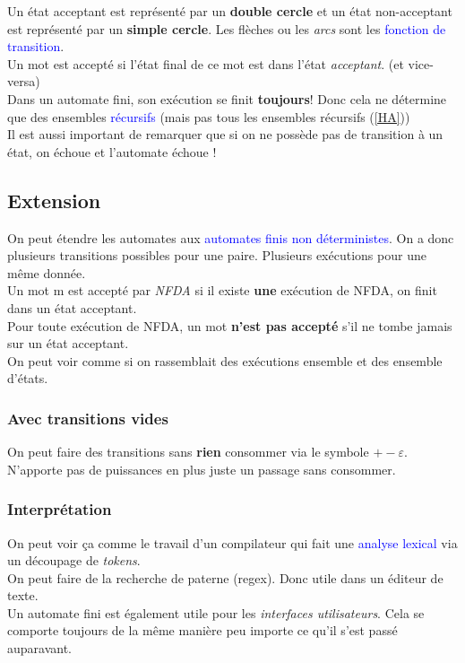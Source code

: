 \documentclass{report}
\begin{document}
Un état acceptant est représenté par un \textbf{double cercle} et un état non-acceptant est représenté par un \textbf{simple cercle}. Les flèches ou les \textit{arcs} sont les \textcolor{blue}{fonction de transition}.\\

Un mot est accepté si l'état final de ce mot est dans l'état \textit{acceptant}. (et vice-versa)\\
Dans un automate fini, son exécution se finit \textbf{toujours}! Donc cela ne détermine que des ensembles \textcolor{blue}{récursifs} (mais pas tous les ensembles récursifs (\ref{HA}))\\
Il est aussi important de remarquer que si on ne possède pas de transition à un état, on échoue et l'automate échoue !

\subsection{Extension}
On peut étendre les automates aux \textcolor{blue}{automates finis non déterministes}. On a donc plusieurs transitions possibles pour une paire. Plusieurs exécutions pour une même donnée.\\
Un mot m est accepté par \textit{NFDA} si il existe \textbf{une} exécution de NFDA, on finit dans un état acceptant.\\
Pour toute exécution de NFDA, un mot \textbf{n'est pas accepté} s'il ne tombe jamais sur un état acceptant.\\

On peut voir comme si on rassemblait des exécutions ensemble et des ensemble d'états.

\subsubsection{Avec transitions vides}
On peut faire des transitions sans \textbf{rien} consommer via le symbole $+-\varepsilon$. N'apporte pas de puissances en plus juste un passage sans consommer.

\subsubsection{Interprétation}
On peut voir ça comme le travail d'un compilateur qui fait une \textcolor{blue}{analyse lexical} via un découpage de \textit{tokens}.\\
On peut faire de la recherche de paterne (regex). Donc utile dans un éditeur de texte.\\
Un automate fini est également utile pour les \textit{interfaces utilisateurs}. Cela se comporte toujours de la même manière peu importe ce qu'il s'est passé auparavant.
\end{document}
